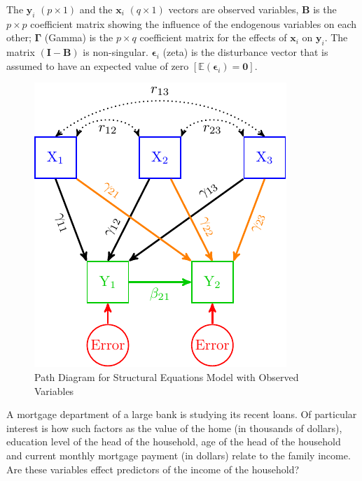 The \(\mathbf{y}_{i}\) \(\left(p\times1\right)\) and the \(\mathbf{x}_{i}\)
\(\left(q\times1\right)\) vectors are observed variables, \(\mathbf{B}\)
is the \(p\times p\) coefficient matrix showing the influence of the endogenous variables on each other; \(\bm{\Gamma}\) (Gamma)
is the \(p\times q\) coefficient matrix for the effects of \(\mathbf{x}_{i}\)
on \(\mathbf{y}_{i}\). The matrix \(\left(\mathbf{I}-\mathbf{B}\right)\)
is non-singular. \(\bm{\epsilon}_{i}\) (zeta) is the disturbance vector
that is assumed to have an expected value of zero \(\left[\mathbb{E}\left(\bm{\epsilon}_{i}\right)=\mathbf{0}\right]\).

\begin{figure}[H]

{\centering \includegraphics[width=0.8\linewidth]{images/SEMO1} 

}

\caption{Path Diagram for Structural Equations Model with Observed Variables}\label{fig:SEMO1}
\end{figure}


\begin{example}
A mortgage department of a large bank is studying its recent loans. Of particular interest is how such factors as the value of the home (in thousands of dollars), education level of the head of the household, age of the head of the household and current monthly mortgage payment (in dollars) relate to the family income. Are these variables effect predictors of the income of the household?
\end{example}


